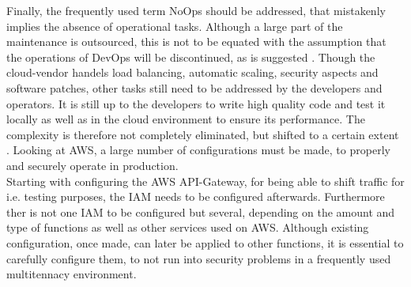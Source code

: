 \documentclass[11pt]{article}
\begin{document}
Finally, the frequently used term \glqq NoOps\grqq{} \cite{fowler2018serverless} should be addressed, that mistakenly implies the absence of operational tasks. Although a large part of the maintenance is outsourced, this is not to be equated with the assumption that the operations of DevOps will be discontinued, as is suggested \cite{fowler2018serverless}.  Though the cloud-vendor handels load balancing, automatic scaling, security aspects and software patches, other tasks still need to be addressed by the developers and operators. It is still up to the developers to write high quality code and test it locally as well as in the cloud environment to ensure its performance. The complexity is therefore not completely eliminated, but shifted to a certain extent \cite{eivy2017wary}. Looking at AWS, a large number of configurations must be made, to properly and securely operate in production.\\ Starting with configuring the AWS API-Gateway, for being able to shift traffic for i.e. testing purposes, the IAM needs to be configured afterwards. Furthermore ther is not one IAM to be configured but several, depending on the amount and type of functions as well as other services used on AWS. Although existing configuration, once made, can later be applied to other functions, it is essential to carefully configure them, to not run into security problems in a frequently used multitennacy environment.
\end{document}
